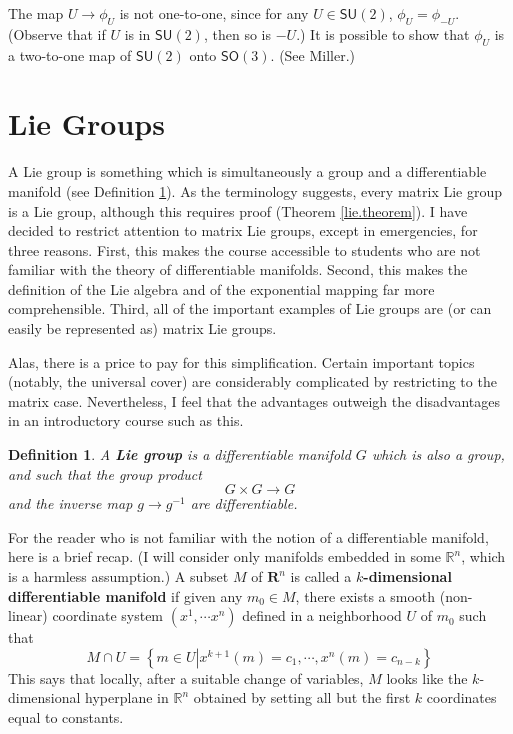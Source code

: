 \documentclass[12pt]{amsbook}
\theoremstyle{plain}
\newtheorem{definition}[theorem]{Definition}
\numberwithin{equation}{chapter}
\numberwithin{theorem}{chapter}
\begin{document}
The map $U\rightarrow\phi_{U}$ is not one-to-one, since for any $U\in
\mathsf{SU}(2)$, $\phi_{U}=\phi_{-U}$. (Observe that if $U$ is in
$\mathsf{SU}(2)$, then so is $-U$.) It is possible to show that $\phi_{U}$ is
a two-to-one map of $\mathsf{SU}(2)$ onto $\mathsf{SO}(3)$. (See Miller.)

\section{Lie Groups\label{lie.groups}}

A Lie group is something which is simultaneously a group and a differentiable
manifold (see Definition \ref{lie.definition}). As the terminology suggests,
every matrix Lie group is a Lie group, although this requires proof (Theorem
\ref{lie.theorem}). I have decided to restrict attention to matrix Lie groups,
except in emergencies, for three reasons. First, this makes the course
accessible to students who are not familiar with the theory of differentiable
manifolds. Second, this makes the definition of the Lie algebra and of the
exponential mapping far more comprehensible. Third, all of the important
examples of Lie groups are (or can easily be represented as) matrix Lie groups.

Alas, there is a price to pay for this simplification. Certain important
topics (notably, the universal cover) are considerably complicated by
restricting to the matrix case. Nevertheless, I feel that the advantages
outweigh the disadvantages in an introductory course such as this.

\begin{definition}
\label{lie.definition}A \textbf{Lie group} is a differentiable manifold $G$
which is also a group, and such that the group product
\[
G\times G\rightarrow G
\]
and the inverse map $g\rightarrow g^{-1}$ are differentiable.
\end{definition}

For the reader who is not familiar with the notion of a differentiable
manifold, here is a brief recap. (I will consider only manifolds embedded in
some $\mathbb{R}^{n}$, which is a harmless assumption.) A subset $M$ of
$\mathbf{R}^{n}$ is called a $k$\textbf{-dimensional differentiable manifold}
if given any $m_{0}\in M$, there exists a smooth (non-linear) coordinate
system $(x^{1},\cdots x^{n})$ defined in a neighborhood $U$ of $m_{0}$ such
that
\[
M\cap U=\left\{  m\in U\left|  x^{k+1}(m)=c_{1},\cdots,x^{n}(m)=c_{n-k}%
\right.  \right\}
\]
This says that locally, after a suitable change of variables, $M$ looks like
the $k$-dimensional hyperplane in $\mathbb{R}^{n}$ obtained by setting all but
the first $k$ coordinates equal to constants.
\end{document}
